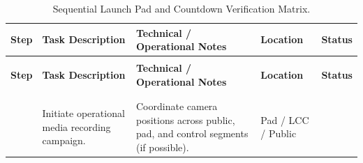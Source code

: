 \documentclass[11pt,a4paper]{article}
\begin{document}
\footnotesize
\begin{xltabular}{\textwidth}{|>{\centering\arraybackslash}p{0.6cm}|X|X|>{\centering\arraybackslash}p{2.8cm}|>{\centering\arraybackslash}p{1.0cm}|}
    
    \caption{Sequential Launch Pad and Countdown Verification Matrix.} \label{tab:launch_pad_checklist} \\ \hline
    \textbf{\color{white}Step} & \textbf{\color{white}Task Description} & \textbf{\color{white}Technical / Operational Notes} & \textbf{\color{white}Location} & \textbf{\color{white}Status} \\ \hline
    \endfirsthead

     \\ \hline
    \textbf{\color{white}Step} & \textbf{\color{white}Task Description} & \textbf{\color{white}Technical / Operational Notes} & \textbf{\color{white}Location} & \textbf{\color{white}Status} \\ \hline
    \endhead

    \hline
     \\ \hline
    \endfoot

    \hline
    \endlastfoot
    
     \\  & Initiate operational media recording campaign. & Coordinate camera positions across public, pad, and control segments (if possible). & Pad / LCC / Public & \\ \hline
    

\end{xltabular}
\end{document}
